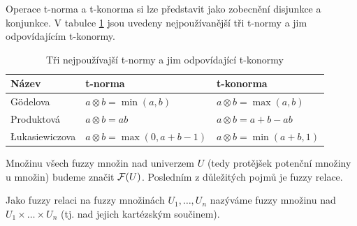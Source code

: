 \documentclass[a4paper,10pt]{article}
\begin{document}
Operace t-norma a t-konorma si lze představit jako zobecnění disjunkce a konjunkce. V tabulce \ref{tbl:Norms} jsou uvedeny nejpoužívanější tři t-normy a jim odpovídajícím t-konormy.
\begin{table}
 \centering
 \begin{tabular}{|l|l|l|}
  \hline
  Název 		& t-norma 				& t-konorma				\\\hline
  \hline
  Gödelova 		& $a \otimes b = \min(a, b)$ 		& $a \otimes b = \max(a, b)$		\\\hline
  Produktová 		& $a \otimes b = a b$ 			& $a \otimes b = a + b - a b$		\\\hline
  \L{}ukasiewiczova 	& $a \otimes b = \max(0, a + b - 1)$ 	& $a \otimes b = \min(a + b, 1)$	\\\hline
 \end{tabular}

 \caption{Tři nejpoužívajší t-normy a jim odpovídající t-konormy}
 \label{tbl:Norms}
\end{table}

Množinu všech fuzzy množin nad univerzem $U$ (tedy protějšek potenční množiny u  množin) budeme značit $\mathcal{F}(U)$. Posledním z důležitých pojmů je fuzzy relace.

%  

\begin{definition}
 Jako fuzzy relaci na fuzzy množinách $U_1, \dots, U_n$ nazýváme fuzzy množinu nad $U_1 \times \dots \times U_n$ (tj. nad jejich kartézským součinem).
\end{definition}


% 
% 

\end{document}
